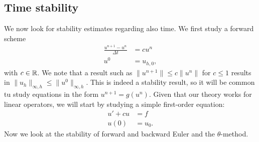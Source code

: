 \subsection{Time stability}
We now look for stability estimates regarding also time. We first study a forward scheme 
\begin{equation}
    \begin{aligned}
        \displaystyle\frac{u^{n+1}-u^n}{\Delta t} &= cu^n\\
        u^0&= u_{h,0},
    \end{aligned}
\end{equation}
with $c\in \mathbb{R}$. We note that a result such as $\|u^{n+1}\|\leq c\|u^n\|$ for $c\leq 1$ results in $\|u_h\|_{\infty, h} \leq \|u^0\|_{\infty, h}$. This is indeed a stability result, so it will be common tu study equations in the form $u^{n+1} = g(u^n)$. Given that our theory works for linear operators, we will start by studying a simple first-order equation:
\begin{equation}
    \begin{aligned}
        u'+cu &= f\\
        u(0) &= u_0.
    \end{aligned}
\end{equation}
Now we look at the stability of forward and backward Euler and the $\theta$-method. 
